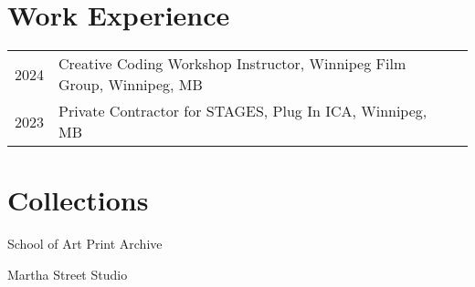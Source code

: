 \documentclass[12pt]{article}
\begin{document}
\begin{flushleft}
\section{Work Experience}
\begin{tabular}{@{}lll}
2024 & Creative Coding Workshop Instructor, Winnipeg Film Group, Winnipeg, MB \\
2023 & Private Contractor for STAGES, Plug In ICA, Winnipeg, MB
\end{tabular}
\section{Collections}
School of Art Print Archive

Martha Street Studio
\end{flushleft}
\end{document}
